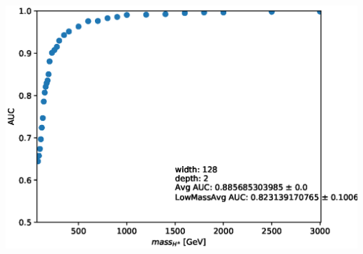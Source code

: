 \documentclass[aspectratio=169,xcolor=table]{beamer}
\begin{document}
\begin{frame}
\begin{columns}
      \includegraphics[height=.25\textheight,keepaspectratio=true]{AUC_Plots/model_GB_1024_channel_taulep_mass_80to3000_ntracks_1_nfolds_5_fold_4_nvars_19_batch_size_1024_epochs_1000_dense_layer_size_128_activation_function_LeakyRelu_depth_2_loss_binary_crossentropy_dropout_0.1_alpha_0.05.eps}

\end{columns}
\end{frame}
\end{document}
